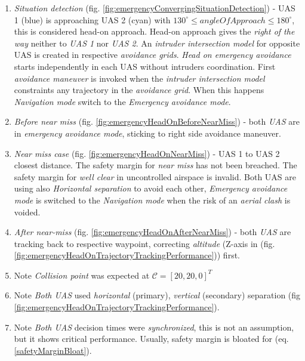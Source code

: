 \begin{enumerate}
    \item \emph{Situation detection} (fig. \ref{fig:emergencyConvergingSituationDetection}) - UAS 1 (blue)  is approaching UAS 2 (cyan) with $130^\circ \le angle Of Approach \le 180^\circ$, this is considered head-on approach. Head-on approach  gives the \emph{right of the way} neither to \emph{UAS 1} nor \emph{UAS 2}. An \emph{intruder intersection model} for opposite UAS is created in respective \emph{avoidance grids}. \emph{Head on emergency avoidance} starts independently in each UAS without intruders coordination. First \emph{avoidance maneuver} is invoked when the \emph{intruder intersection model} constraints any trajectory in the \emph{avoidance grid}. When this happens \emph{Navigation mode} switch to the \emph{Emergency avoidance mode}.
                
    \item \emph{Before near miss} (fig. \ref{fig:emergencyHeadOnBeforeNearMiss}) - both \emph{UAS} are in \emph{emergency avoidance mode}, sticking to right side avoidance maneuver.
    
    \item \emph{Near miss case} (fig. \ref{fig:emergencyHeadOnNearMiss}) - UAS 1 to UAS 2 closest distance. The safety margin for \emph{near miss} has not been breached. The safety margin for \emph{well clear} in uncontrolled airspace is invalid. Both UAS are using also \emph{Horizontal separation} to avoid each other, \emph{Emergency avoidance mode} is switched to the \emph{Navigation mode} when the risk of an \emph{aerial clash} is voided.
    
    \item \emph{After near-miss} (fig. \ref{fig:emergencyHeadOnAfterNearMiss}) - both \emph{UAS} are tracking back to respective waypoint, correcting \emph{altitude} (Z-axis in (fig. \ref{fig:emergencyHeadOnTrajectoryTrackingPerformance})) first.
    
    \item Note \emph{Collision point} was expected at $\mathscr{C}=[20,20,0]^T$
    
    \item Note \emph{Both UAS} used \emph{horizontal} (primary), \emph{vertical} (secondary) separation (fig \ref{fig:emergencyHeadOnTrajectoryTrackingPerformance}).
    
    \item Note \emph{Both UAS} decision times were \emph{synchronized}, this is not an assumption, but it shows critical performance. Usually, safety margin is bloated for (eq.\ref{safetyMarginBloat}).
\end{enumerate}


